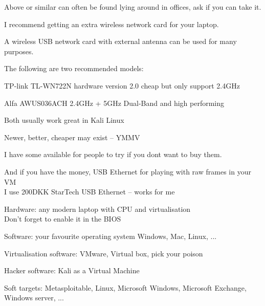 \documentclass[Screen16to9,17pt]{foils}
\begin{document}
Above or similar can often be found lying around in offices, ask if you can take it.



I recommend getting an extra wireless network card for your laptop.

A wireless USB network card with external antenna can be used for many purposes.

\begin{list2}
\item The following are two recommended models:
\item TP-link TL-WN722N hardware version 2.0 cheap but only support 2.4GHz
\item Alfa AWUS036ACH 2.4GHz + 5GHz Dual-Band and high performing
\item Both usually work great in Kali Linux
\item Newer, better, cheaper may exist -- YMMV
\end{list2}

I have some available for people to try if you dont want to buy them.

And if you have the money, USB Ethernet for playing with raw frames in your VM\\
I use 200DKK StarTech USB Ethernet -- works for me




\begin{list2}
\item Hardware: any modern laptop with CPU and virtualisation\\
Don't forget to enable it in the BIOS
\item Software: your favourite operating system Windows, Mac, Linux, ...
\item Virtualisation software: VMware, Virtual box, pick your poison
\item Hacker software: Kali as a Virtual Machine 
\item Soft targets: Metasploitable, Linux, Microsoft Windows, Microsoft Exchange, Windows server, ...
\end{list2}




\myquestionspage
\end{document}
